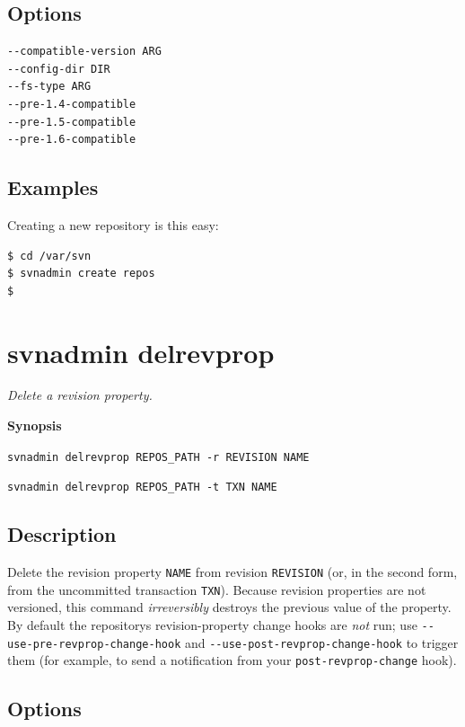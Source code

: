 \subsection{Options}

\begin{verbatim}
--compatible-version ARG
--config-dir DIR
--fs-type ARG
--pre-1.4-compatible
--pre-1.5-compatible
--pre-1.6-compatible
\end{verbatim}

\subsection{Examples}

Creating a new repository is this easy:

\begin{verbatim}
$ cd /var/svn
$ svnadmin create repos
$
\end{verbatim}

\section{svnadmin delrevprop}\label{svn.ref.svnadmin.c.delrevprop}

\emph{Delete a revision property.}

\textbf{Synopsis}

\texttt{svnadmin\ delrevprop\ REPOS\_PATH\ -r\ REVISION\ NAME}

\texttt{svnadmin\ delrevprop\ REPOS\_PATH\ -t\ TXN\ NAME}

\subsection{Description}

Delete the revision property \texttt{NAME} from revision
\texttt{REVISION} (or, in the second form, from the uncommitted
transaction \texttt{TXN}). Because revision properties are not versioned,
this command \emph{irreversibly} destroys the previous value of the
property. By default the repository\textquotesingle s revision-property
change hooks are \emph{not} run; use
\texttt{-\/-use-pre-revprop-change-hook} and
\texttt{-\/-use-post-revprop-change-hook} to trigger them (for example,
to send a notification from your \texttt{post-revprop-change} hook).

\subsection{Options}

